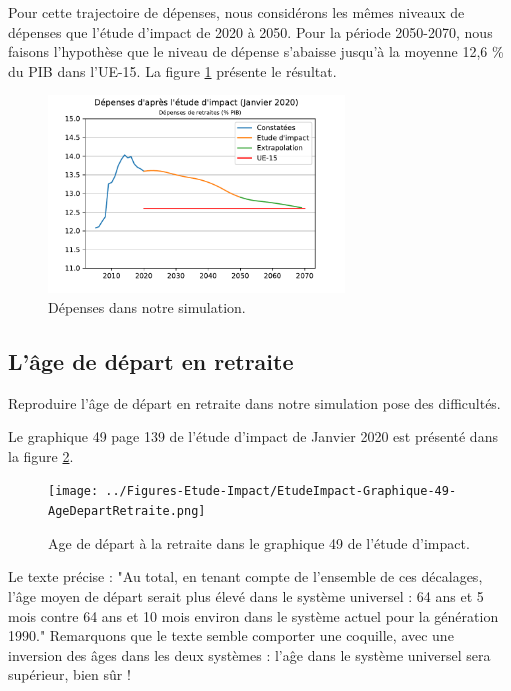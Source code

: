 \documentclass[10pt]{article}
\begin{document}
Pour cette trajectoire de dépenses, nous considérons les mêmes 
niveaux de dépenses que l'étude d'impact de 2020 à 2050. 
Pour la période 2050-2070, nous faisons l'hypothèse que le niveau 
de dépense s'abaisse jusqu'à la moyenne 12,6 \% du PIB dans l’UE-15. 
La figure \ref{fig-dépenses-simulation} présente le résultat. 

\begin{figure}
\begin{center}
\includegraphics[width=0.7\textwidth]{Simulation-Depenses.pdf}
\end{center}
\caption{Dépenses dans notre simulation.}
\label{fig-dépenses-simulation}
\end{figure}


\subsection{L'âge de départ en retraite}

Reproduire l'âge de départ en retraite dans notre simulation 
pose des difficultés. 

Le graphique 49 page 139 de l'étude d'impact de Janvier 2020 est présenté 
dans la figure \ref{fig-age-etude-impact}.

\begin{figure}
\begin{center}
\texttt{[image: ../Figures-Etude-Impact/EtudeImpact-Graphique-49-AgeDepartRetraite.png]}
\end{center}
\caption{Age de départ à la retraite dans le graphique 49 de l'étude d'impact.}
\label{fig-age-etude-impact}
\end{figure}

Le texte précise : "Au total, en tenant compte de l’ensemble de ces 
décalages, l’âge moyen de départ serait plus élevé dans le système 
universel : 64 ans et 5 mois contre 64 ans et 10 mois environ dans 
le système actuel pour la génération 1990." 
Remarquons que le texte semble comporter une coquille, avec une inversion 
des âges dans les deux systèmes : l'aĝe dans le système universel sera supérieur, 
bien sûr ! 
\end{document}
